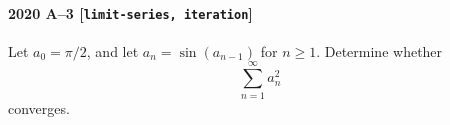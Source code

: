 \paragraph{2020 A--3 \textnormal{[\texttt{limit-series, iteration}]}}
Let $a_0 = \pi/2$, and let $a_n = \sin(a_{n-1})$ for $n \geq 1$. Determine whether
\[
\sum_{n=1}^\infty a_n^2
\]
converges.
